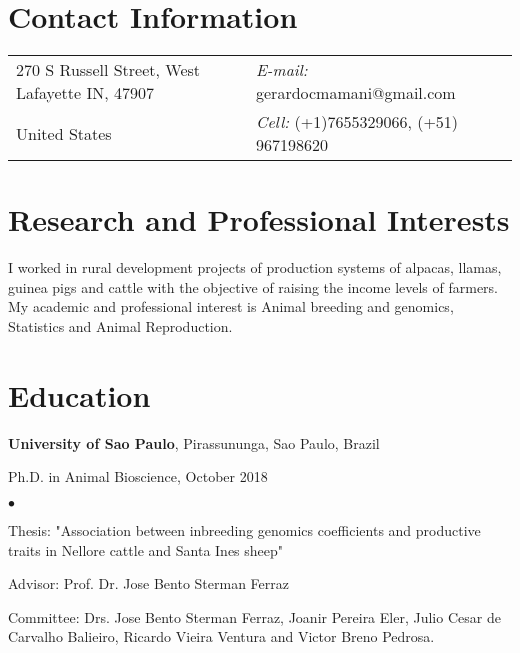 \documentclass[margin,line,10pt]{res}
\newenvironment{list1}{
  \begin{list}{\ding{113}}{%
      \setlength{\itemsep}{0in}
      \setlength{\parsep}{0in} \setlength{\parskip}{0in}
      \setlength{\topsep}{0in} \setlength{\partopsep}{0in} 
      \setlength{\leftmargin}{0.17in}}}{\end{list}}
\newenvironment{list2}{
  \begin{list}{$\bullet$}{%
      \setlength{\itemsep}{0in}
      \setlength{\parsep}{0in} \setlength{\parskip}{0in}
      \setlength{\topsep}{0in} \setlength{\partopsep}{0in} 
      \setlength{\leftmargin}{0.2in}}}{\end{list}}
\begin{document}

\begin{resume}

\section{\sc Contact Information}
\vspace{.05in}
\begin{tabular} {@{}p{3in}p{4in}}
270 S Russell Street, West Lafayette IN, 47907  & \hspace{1.8cm} {\it E-mail:} gerardocmamani@gmail.com \\      United States    & \hspace{1.8cm} {\it Cell:}  (+1)7655329066, (+51) 967198620    \\     
\end{tabular}


\vspace{0.3cm}

\section{\sc Research and Professional Interests}

I worked in rural development projects of production systems of alpacas, llamas, guinea pigs and cattle with the objective of raising the income levels of farmers. My academic and professional interest is Animal breeding and genomics, Statistics and Animal Reproduction. 
 
\section{\sc Education}

{\bf University of Sao Paulo}, Pirassununga, Sao Paulo, Brazil\\
\vspace*{-.1in}
\begin{list1}
\item[] Ph.D. in Animal Bioscience, October 2018
\begin{list2}
\vspace*{.05in}
\item Thesis: "Association between inbreeding genomics coefficients and productive traits in Nellore cattle and Santa Ines sheep" 
\item Advisor: Prof. Dr. Jose Bento Sterman Ferraz 
\item Committee: Drs. Jose Bento Sterman Ferraz, Joanir Pereira Eler, Julio Cesar de Carvalho Balieiro, Ricardo Vieira Ventura and Victor Breno Pedrosa.
\end{list2}
\vspace*{.05in}
\end{list1}


\end{resume}
\end{document}
